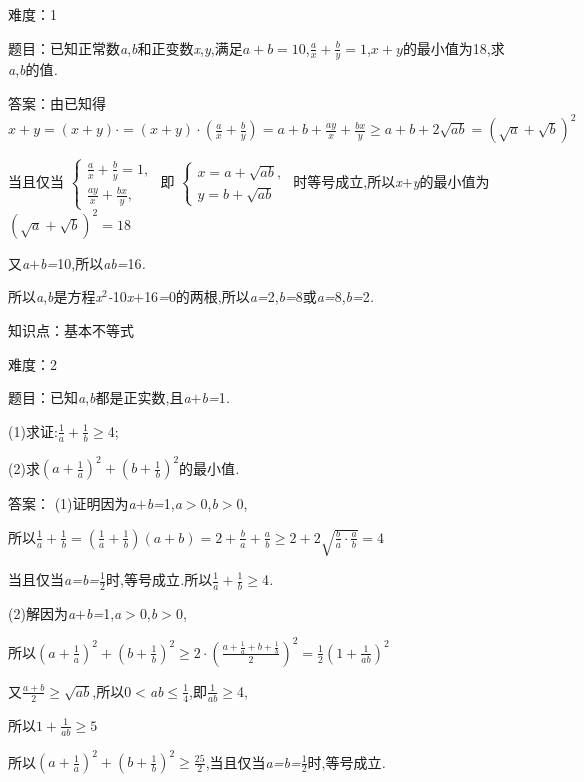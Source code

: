 \documentclass{article} %
\begin{document}
难度：1

 题目：已知正常数\textit{a},\textit{b}和正变数\textit{x},\textit{y},满足$a+b=10$,$\frac{a}{x}+\frac{b}{y}=1$,$x+y$的最小值为18,求\textit{a},\textit{b}的值\textit{.}

 答案：由已知得
$x+y=(x+y)\cdot =(x+y)\cdot (\frac{a}{x}+\frac{b}{y})= a+b+\frac{ay}{x}+\frac{bx}{y} \ge a+b+2\sqrt{ab}={(\sqrt{a}+\sqrt{b})}^2$

当且仅当
$
\begin{cases}
\frac{a}{x}+\frac{b}{y}=1,\\
\frac{ay}{x}+\frac{bx}{y},
\end{cases}
$
即
$
\begin{cases}
x=a+\sqrt{ab},\\
y=b+\sqrt{ab}
\end{cases}
$
时等号成立,所以\textit{x$+$y}的最小值为${(\sqrt{a}+\sqrt{b})}^2=18$

又\textit{a$+$b=}10,所以\textit{ab=}16\textit{.}

所以\textit{a},\textit{b}是方程\textit{x}${}^{2}$\textit{-}10\textit{x$+$}16\textit{=}0的两根,所以\textit{a=}2,\textit{b=}8或\textit{a=}8,\textit{b=}2\textit{.}

知识点：基本不等式

难度：2

题目：已知\textit{a},\textit{b}都是正实数,且\textit{a$+$b=}1\textit{.}

 (1)求证:$\frac{1}{a}+\frac{1}{b}$$\mathrm{\ge}$4;

 (2)求${(a+\frac{1}{a})}^2+{(b+\frac{1}{b})}^2$的最小值\textit{.}

 答案： (1)证明因为\textit{a$+$b=}1,\textit{a$>$}0,\textit{b$>$}0,

所以$\frac{1}{a}+\frac{1}{b}=(\frac{1}{a}+\frac{1}{b})(a+b)=2+\frac{b}{a}+\frac{a}{b} \ge 2+2\sqrt{\frac{b}{a}\cdot \frac{a}{b}}=4$

当且仅当\textit{a=b=}$\frac{1}{2}$时,等号成立\textit{.}所以$\frac{1}{a}+\frac{1}{b}$$\mathrm{\ge}$4\textit{.}

 (2)解因为\textit{a$+$b=}1,\textit{a$>$}0,\textit{b$>$}0,

所以${(a+\frac{1}{a})}^2+{(b+\frac{1}{b})}^2 \ge 2\cdot {(\frac{a+\frac{1}{a}+b+\frac{1}{b}}{2})}^2=\frac{1}{2}{(1+\frac{1}{ab})}^2$

又$\frac{a+b}{2} \ge \sqrt{ab}$,所以0\textit{$<$ab}$\mathrm{\le}\frac{1}{4}$,即$\frac{1}{ab}$$\mathrm{\ge}$4,

所以$1+\frac{1}{ab} \ge 5$

所以${(a+\frac{1}{a})}^2+{(b+\frac{1}{b})}^2 \ge \frac{25}{2}$,当且仅当\textit{a=b=}$\frac{1}{2}$时,等号成立\textit{.}
\end{document}
